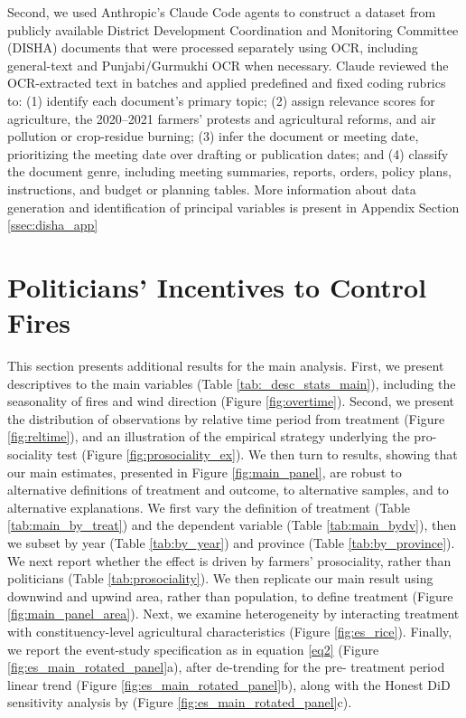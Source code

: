 \documentclass[12pt]{article}
\begin{document}
{Second, we used Anthropic’s Claude Code agents to construct a dataset from publicly available District Development Coordination and Monitoring Committee (DISHA) documents that were processed separately using OCR, including general-text and Punjabi/Gurmukhi OCR when necessary. Claude reviewed the OCR-extracted text in batches and applied predefined and fixed coding rubrics to: (1) identify each document’s primary topic; (2) assign relevance scores for agriculture, the 2020--2021 farmers’ protests and agricultural reforms, and air pollution or crop-residue burning; (3) infer the document or meeting date, prioritizing the meeting date over drafting or publication dates; and (4) classify the document genre, including meeting summaries, reports, orders, policy plans, instructions, and budget or planning tables. More information about data generation and identification of principal variables is present in Appendix Section \ref{ssec:disha_app}



\FloatBarrier
\section{Politicians' Incentives to Control Fires}
This section presents additional results for the main analysis. First, we present descriptives to the main variables (Table \ref{tab:_desc_stats_main}), including the seasonality of fires and wind direction (Figure \ref{fig:overtime}). Second, we present the distribution of observations by relative time period from treatment (Figure \ref{fig:reltime}), and an illustration of the empirical strategy underlying the pro-sociality test (Figure \ref{fig:prosociality_ex}). We then turn to results, showing that our main estimates, presented in Figure \ref{fig:main_panel}, are robust to alternative definitions of treatment and outcome, to alternative samples, and to alternative explanations.
%
We first vary the definition of treatment (Table \ref{tab:main_by_treat}) and the dependent variable (Table  \ref{tab:main_bydv}), then we subset by year (Table \ref{tab:by_year}) and province (Table \ref{tab:by_province}). We next report whether the effect is driven by farmers' prosociality, rather than politicians (Table \ref{tab:prosociality}). We then replicate our main result using downwind and upwind area, rather than population, to define treatment (Figure \ref{fig:main_panel_area}). Next, we examine heterogeneity by interacting treatment with constituency-level agricultural characteristics (Figure \ref{fig:es_rice}). Finally, we report the event-study specification as in equation \ref{eq2} (Figure \ref{fig:es_main_rotated_panel}a), after de-trending for the pre-
treatment period linear trend (Figure \ref{fig:es_main_rotated_panel}b), along with the Honest DiD sensitivity analysis by \citet{rambachan2023more} (Figure \ref{fig:es_main_rotated_panel}c). 


}
\end{document}
